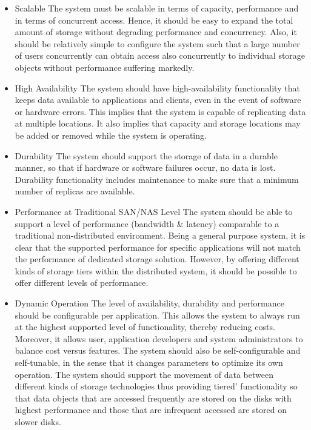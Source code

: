 \documentclass[11pt]{article}
\begin{document}
\begin{itemize}
\item Scalable The system must be scalable in terms of capacity, performance 
and in terms of concurrent access. Hence, it should be easy to expand the 
total amount of storage without degrading performance and concurrency. Also, 
it should be relatively simple to configure the system such that a large 
number of users concurrently can obtain access also concurrently to 
individual storage objects without performance suffering markedly.

\item High Availability The system should have high-availability functionality 
that keeps data available to applications and clients, even in the event of 
software or hardware errors. This implies that the system is capable of 
replicating data at multiple locations. It also implies that capacity and 
storage locations may be added or removed while the system is operating.

\item Durability The system should support the storage of data in a durable 
manner, so that if hardware or software failures occur, no data is lost. 
Durability functionality includes maintenance to make sure that a minimum 
number of replicas are available. 

\item Performance at Traditional SAN/NAS Level The system should be able to 
support a level of performance (bandwidth \& latency) comparable to a 
traditional non-distributed environment. Being a general purpose system, 
it is clear that the supported performance for specific applications will 
not match the performance of dedicated storage solution. However, by 
offering different kinds of storage tiers within the distributed system, 
it should be possible to offer different levels of performance. 

\item Dynamic Operation The level of availability, durability and performance 
should be configurable per application. This allows the system to always 
run at the highest supported level of functionality, thereby reducing costs. 
Moreover, it allows user, application developers and system administrators 
to balance cost versus features. The system should also be self-configurable 
and self-tunable, in the sense that it changes parameters to optimize its 
own operation. The system should support the movement of  data between 
different kinds of storage technologies thus providing tiered’ 
functionality so that data objects that are accessed frequently are 
stored on the disks with highest performance and those that are infrequent 
accessed are stored on slower disks. 


\end{itemize}
\end{document}
